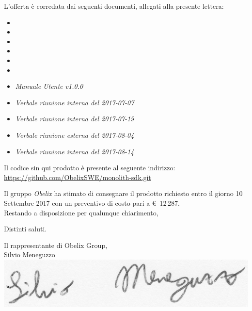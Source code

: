 \documentclass[10 pt,a4paper]{article}
\begin{document}
L'offerta è corredata dai seguenti documenti, allegati alla presente
lettera:
\vspace{.1in}
\begin{itemize}
\item \analisideirequisiti
\item \pianodiprogetto
\item \pianodiqualifica
\item \normediprogetto
\item \gloss
\item {}
\item \emph{Manuale Utente v1.0.0}
\item \emph{Verbale riunione interna del 2017-07-07}
\item \emph{Verbale riunione interna del 2017-07-19}
\item \emph{Verbale riunione esterna del 2017-08-04}
\item \emph{Verbale riunione interna del 2017-08-14}
\end{itemize}

Il codice sin qui prodotto è presente al seguente indirizzo: \\
\url{https://github.com/ObelixSWE/monolith-sdk.git}

\clearpage

Il gruppo \emph{Obelix} ha stimato di consegnare il prodotto richiesto
entro il giorno 10 Settembre 2017 con un preventivo di costo pari
a \euro  \, 12\,287. \\

\vspace{.5in}
Restando a disposizione per qualunque chiarimento,\\

\vspace{.1in}

Distinti saluti.

\vspace{.15in}


\begin{flushright}
Il rappresentante di Obelix Group,\\
Silvio Meneguzzo\\
\includegraphics[width=.5\textwidth]{../../file_comuni/firme/sm.jpg}
\end{flushright}
\end{document}
